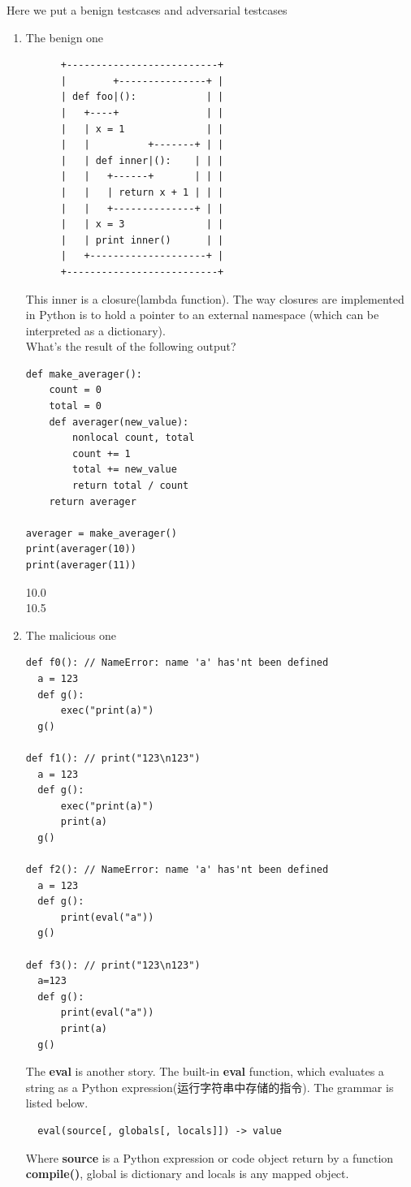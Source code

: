 \documentclass[a4paper]{exam}
\begin{document}
Here we put a benign testcases and adversarial testcases
\begin{enumerate}
  \item  The benign one
        \begin{verbatim}
      +--------------------------+
      |        +---------------+ |
      | def foo|():            | |
      |   +----+               | |
      |   | x = 1              | |
      |   |          +-------+ | |
      |   | def inner|():    | | |
      |   |   +------+       | | |
      |   |   | return x + 1 | | |
      |   |   +--------------+ | |
      |   | x = 3              | |
      |   | print inner()      | |
      |   +--------------------+ |
      +--------------------------+
\end{verbatim}

        This inner is a closure(lambda function). The way closures are implemented in Python is to hold a pointer to an external namespace (which can be interpreted as a dictionary).
        \\
         What's the result of the following output?
        \begin{verbatim}
def make_averager():
    count = 0
    total = 0
    def averager(new_value):
        nonlocal count, total
        count += 1
        total += new_value
        return total / count
    return averager

averager = make_averager()
print(averager(10))
print(averager(11))
\end{verbatim}
        \begin{solution}
10.0\\
10.5
        \end{solution}
  \item The malicious one
        \begin{verbatim}
def f0(): // NameError: name 'a' has'nt been defined
  a = 123
  def g():
      exec("print(a)")
  g()

def f1(): // print("123\n123")
  a = 123
  def g():
      exec("print(a)")
      print(a)
  g()

def f2(): // NameError: name 'a' has'nt been defined
  a = 123
  def g():
      print(eval("a"))
  g()

def f3(): // print("123\n123")
  a=123
  def g():
      print(eval("a"))
      print(a)
  g()
\end{verbatim}
        The \textbf{eval} is another story. The built-in \textbf{eval} function, which evaluates a string as a Python expression(运行字符串中存储的指令). The grammar is listed below.
        \begin{verbatim}
  eval(source[, globals[, locals]]) -> value
\end{verbatim}
        Where \textbf{source} is a Python expression or code object return by a function \textbf{compile()}, global is dictionary and locals is any mapped object.

\end{enumerate}
\end{document}
